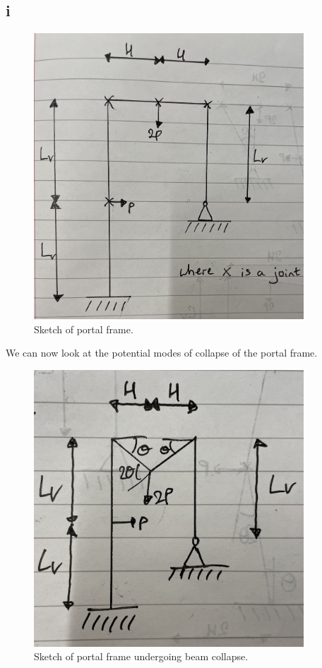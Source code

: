 \documentclass[11pt]{article}
\numberwithin{equation}{section}
\begin{document}
\subsection{i}
\begin{figure}[H]
    \centering
    \includegraphics[width = 0.9\textwidth]{./img/q3i1.jpg}
    \caption{Sketch of portal frame.}
\end{figure}
\newpage
We can now look at the potential modes of collapse of the portal frame. 
\begin{figure}[H]
    \centering
    \includegraphics[width = 0.9\textwidth]{./img/q3i2.jpg}
    \caption{Sketch of portal frame undergoing beam collapse.}
\end{figure}
\end{document}
